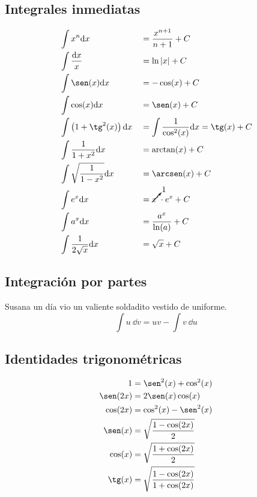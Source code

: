 \documentclass[a4paper, 8pt]{extarticle}
\begin{document}
\begin{multicols}{3}
  \subsection{Integrales inmediatas}
  \begin{align*}
     & \int x^n \dd x                          &  & = \frac{x^{n+1}}{n+1} + C                        \\
     & \int \frac{\dd x}{x}                    &  & = \ln \abs{x} + C                                \\
     & \int \sen (x) \dd x                     &  & = -\cos (x) + C                                  \\
     & \int \cos (x) \dd x                     &  & =  \sen (x) + C                                  \\
     & \int \left( 1 + \tg ^2(x) \right) \dd x &  & = \int \frac{1}{\cos ^2 (x)} \dd x = \tg (x) + C \\
     & \int \frac{1}{1 + x^2} \dd x            &  & = \arctan (x) + C                                \\
     & \int \sqrt{\frac{1}{1-x^2}} \dd x       &  & = \arcsen (x) + C                                \\
     & \int e^x \dd x                          &  & = \cancelto{1}{x'} \cdot e^x + C                 \\
     & \int a^x \dd x                          &  & = \frac{a^x}{\ln (a)} + C                        \\
     & \int \frac{1}{2 \sqrt{x}}	\dd x         &  & = \sqrt{x} + C                                   \\
  \end{align*}

  \subsection{Integración por partes}
  Susana un día vio un valiente soldadito vestido de uniforme.
  \[ \int u\ \dd v = uv - \int v\ \dd u \]

  \subsection{Identidades trigonométricas}
  \begin{align*}
    1         & = \sen^2 (x) + \cos^2(x)                     \\
    \sen (2x) & =2 \sen(x) \cos(x)                           \\
    \cos (2x) & = \cos^2(x) - \sen^2(x)                      \\
    \sen (x)  & = \sqrt{\frac{1 - \cos (2x)}{2}}             \\
    \cos (x)  & = \sqrt{\frac{1 + \cos (2x)}{2}}             \\
    \tg (x)   & = \sqrt{\frac{1 - \cos (2x)}{1 + \cos (2x)}} \\
  \end{align*}

\end{multicols}
\end{document}
